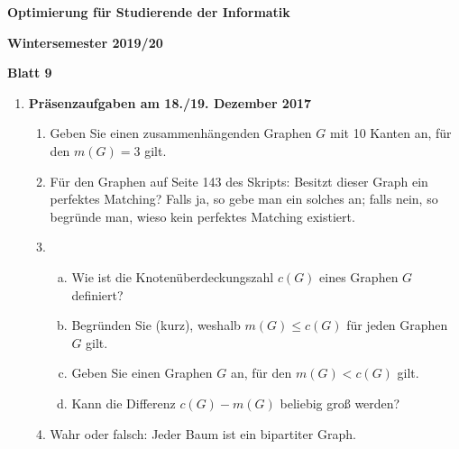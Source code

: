 \documentclass[11pt, a4paper]{article}
\begin{document}
\begin{center}
\begin{Large}
\textbf{Optimierung für Studierende der Informatik}
\end{Large}

\textbf{}
	
\vspace{0.5cm}

\textbf{Wintersemester 2019/20}

\textbf{Blatt 9}

\vspace{0.5cm}
\end{center}

\small

\begin{enumerate}[\bfseries A:]


\item \textbf{Präsenzaufgaben am 18./19. Dezember 2017}

\begin{enumerate}[\bfseries 1.]

\item Geben Sie einen zusammenhängenden Graphen $G$ mit 10 Kanten an, für den $m(G) = 3$ gilt.

\item Für den Graphen auf Seite 143 des Skripts: Besitzt dieser Graph ein perfektes Matching? Falls ja, so gebe man ein solches an; falls nein, so begründe man, wieso kein perfektes Matching existiert.

\item \begin{enumerate}[a)]
\item Wie ist die Knotenüberdeckungszahl $c(G)$ eines Graphen $G$ definiert?
\item Begründen Sie (kurz), weshalb $m(G) \leq c(G)$ für jeden Graphen $G$ gilt.
\item Geben Sie einen Graphen $G$ an, für den $m(G) < c(G)$ gilt.
\item Kann die Differenz $c(G) - m(G)$ beliebig groß werden?
\end{enumerate}


\item Wahr oder falsch: Jeder Baum ist ein bipartiter Graph.


\end{enumerate}
\end{enumerate}
\end{document}
